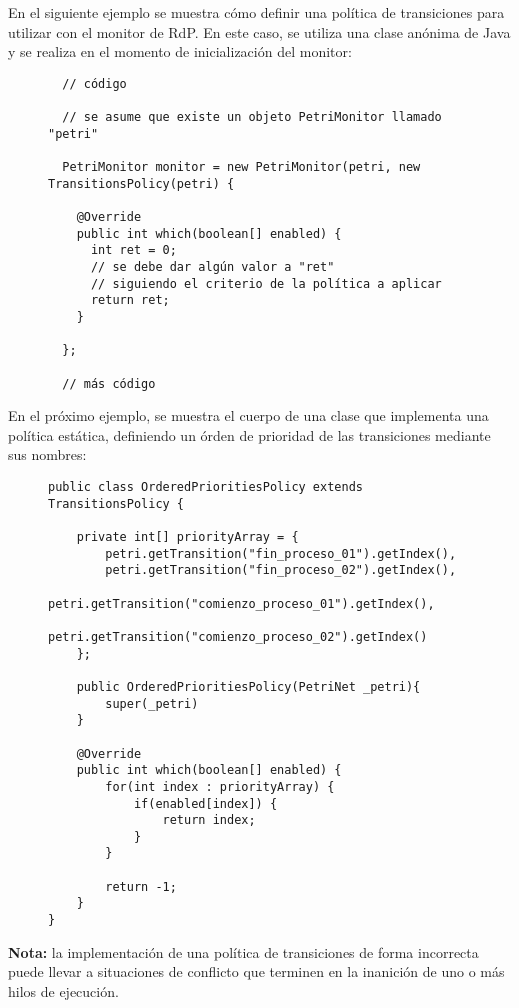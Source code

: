En el siguiente ejemplo se muestra cómo definir una política de transiciones
para utilizar con el monitor de RdP. En este caso, se utiliza una clase anónima
de Java y se realiza en el momento de inicialización del monitor:

\begin{figure}[H]
\centering
\begin{verbatim}
  // código
  
  // se asume que existe un objeto PetriMonitor llamado "petri"
  
  PetriMonitor monitor = new PetriMonitor(petri, new TransitionsPolicy(petri) {
  
    @Override
    public int which(boolean[] enabled) {
      int ret = 0;
      // se debe dar algún valor a "ret"
      // siguiendo el criterio de la política a aplicar
      return ret;
    }
    
  };
  
  // más código
\end{verbatim}
\end{figure}

En el próximo ejemplo, se muestra el cuerpo de una clase que implementa una
política estática, definiendo un órden de prioridad de las transiciones mediante sus
nombres:

\begin{figure}[H]
\centering
\begin{verbatim}
public class OrderedPrioritiesPolicy extends TransitionsPolicy {

    private int[] priorityArray = {
        petri.getTransition("fin_proceso_01").getIndex(),
        petri.getTransition("fin_proceso_02").getIndex(),
        petri.getTransition("comienzo_proceso_01").getIndex(),
        petri.getTransition("comienzo_proceso_02").getIndex()
    };

    public OrderedPrioritiesPolicy(PetriNet _petri){
        super(_petri)
    }
    
    @Override
    public int which(boolean[] enabled) {
        for(int index : priorityArray) {
            if(enabled[index]) {
                return index;
            }
        }
        
        return -1;
    }
}
\end{verbatim}
\end{figure}

\begin{framed}
\textbf{Nota:} la implementación de una política de transiciones de forma
incorrecta puede llevar a situaciones de conflicto que terminen en la inanición
de uno o más hilos de ejecución.
\end{framed}
